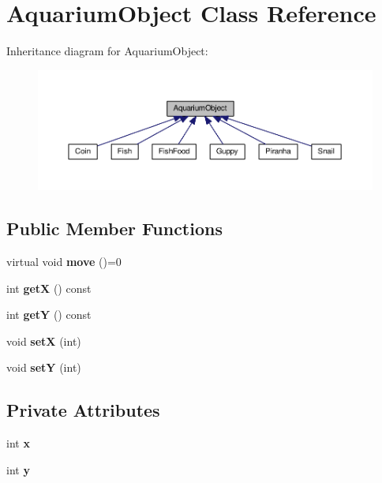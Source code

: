 \hypertarget{class_aquarium_object}{}\section{Aquarium\+Object Class Reference}
\label{class_aquarium_object}


Inheritance diagram for Aquarium\+Object\+:\nopagebreak
\begin{figure}[H]
\begin{center}
\leavevmode
\includegraphics[width=350pt]{class_aquarium_object__inherit__graph}
\end{center}
\end{figure}
\subsection*{Public Member Functions}
\begin{DoxyCompactItemize}
\item 
\mbox{\label{class_aquarium_object_a42c4de640f89ac8aebc26b7618578575}} 
virtual void {\bfseries move} ()=0
\item 
\mbox{\label{class_aquarium_object_a1dd18ba4c21c8fb1c0796791f527a257}} 
int {\bfseries getX} () const
\item 
\mbox{\label{class_aquarium_object_a53eadc1189fa466e61b5f6b2b597de4b}} 
int {\bfseries getY} () const
\item 
\mbox{\label{class_aquarium_object_a650f8f46f51ca64889fd3e1455f9696c}} 
void {\bfseries setX} (int)
\item 
\mbox{\label{class_aquarium_object_aa2ee76b48d56edf3b4cc5bcd199f8efe}} 
void {\bfseries setY} (int)
\end{DoxyCompactItemize}
\subsection*{Private Attributes}
\begin{DoxyCompactItemize}
\item 
\mbox{\label{class_aquarium_object_a972920a5b11f5ce825983fde33c1af53}} 
int {\bfseries x}
\item 
\mbox{\label{class_aquarium_object_a823e2b6e65e5dc1d650af83097eac427}} 
int {\bfseries y}
\end{DoxyCompactItemize}


